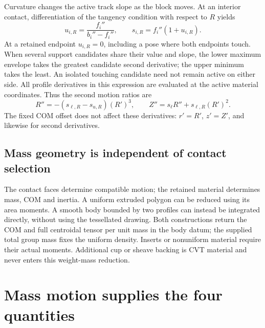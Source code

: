 \documentclass[11pt,letterpaper]{article}
\numberwithin{equation}{section}
\begin{document}
Curvature changes the active track slope as the block moves. At an interior
contact, differentiation of the tangency condition with respect to $R$ yields
\begin{equation}
 u_{i,R}=\frac{f_i''}{b_i''-f_i''},\qquad
 s_{i,R}=f_i''(1+u_{i,R}).
 \label{eq:contact-migration}
\end{equation}
At a retained endpoint $u_{i,R}=0$, including a pose where both endpoints
touch. When several support candidates share their value and slope, the
lower maximum envelope takes the greatest candidate second derivative;
the upper minimum takes the least. An isolated touching candidate need not
remain active on either side. All profile derivatives in this expression
are evaluated at the active material coordinates. Thus the second motion
ratios are
\begin{equation}
 R''=-(s_{\ell,R}-s_{u,R})(R')^3,\qquad
 Z''=s_\ell R''+s_{\ell,R}(R')^2.
 \label{eq:second}
\end{equation}
The fixed COM offset does not affect these derivatives: $r'=R'$, $z'=Z'$,
and likewise for second derivatives.

\subsection{Mass geometry is independent of contact selection}

The contact faces determine compatible motion; the retained material determines
mass, COM and inertia. A uniform extruded polygon can be reduced using its area
moments. A smooth body bounded by two profiles can instead be integrated
directly, without using the tessellated drawing. Both constructions return
the COM and full centroidal tensor per unit mass in the body datum; the
supplied total group mass fixes the uniform density. Inserts or nonuniform
material require their actual moments. Additional cup or sheave backing is
CVT material and never enters this weight-mass reduction.

\section{Mass motion supplies the four quantities}
\label{sec:inertia}
\end{document}

